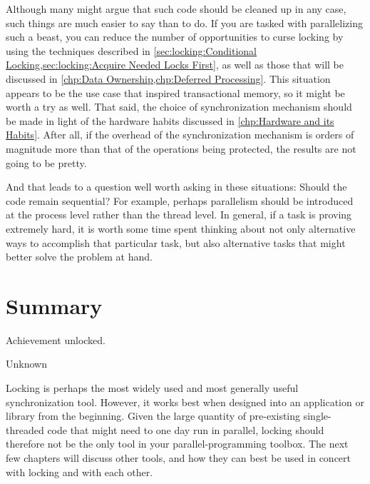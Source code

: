 Although many might argue that such code should be cleaned up in any
case, such things are much easier to say than to do.
If you are tasked with parallelizing such a beast, you can reduce the
number of opportunities to curse locking by using the techniques
described in
\cref{sec:locking:Conditional Locking,sec:locking:Acquire Needed Locks First},
as well as those that will be discussed in
\cref{chp:Data Ownership,chp:Deferred Processing}.
This situation appears to be the use case that inspired transactional
memory, so it might be worth a try as well.
That said, the choice of synchronization mechanism should be made in
light of the hardware habits discussed in
\cref{chp:Hardware and its Habits}.
After all, if the overhead of the synchronization mechanism is orders of
magnitude more than that of the operations being protected, the results
are not going to be pretty.

And that leads to a question well worth asking in these situations:
Should the code remain sequential?
For example, perhaps parallelism should be introduced at the process level
rather than the thread level.
In general, if a task is proving extremely hard, it is worth some time
spent thinking about not only alternative ways to accomplish that
particular task, but also alternative tasks that might better solve
the problem at hand.

\section{Summary}
\label{sec:locking:Summary}
%
\epigraph{Achievement unlocked.}{Unknown}

Locking is perhaps the most widely used and most generally useful
synchronization tool.
However, it works best when designed into an application
or library from the beginning.
Given the large quantity of pre-existing single-threaded code that might
need to one day run in parallel, locking should therefore not be the
only tool in your parallel-programming toolbox.
The next few chapters will discuss other tools, and how they can best
be used in concert with locking and with each other.


